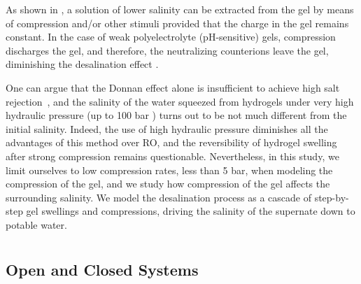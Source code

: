 \documentclass[gels,article,accept,pdftex,moreauthors]{Definitions/mdpi}
\providecommand{\DIFadd}[1]{{\protect\color{blue}\uwave{#1}}} %
\providecommand{\DIFaddbegin}{} %
\providecommand{\DIFaddend}{} %
\providecommand{\DIFdelbegin}{} %
\providecommand{\DIFdelend}{} %
\begin{document}
As shown in \cite{Li2011, Ali2015, Arens_2017, Fengler_2020}, a solution of lower salinity can be extracted from the gel by means of compression and/or other stimuli provided that the charge in the gel remains constant.
In the case of weak polyelectrolyte (pH-sensitive) gels, compression discharges the gel, and therefore, the neutralizing counterions leave the gel, diminishing the desalination effect \cite{Rud2018}.

One can argue that the Donnan effect alone is insufficient to achieve high salt rejection~\cite{Cai2016}, and the salinity of the water squeezed from hydrogels under very high hydraulic pressure (up to 100 bar \cite{Fengler_2020}) turns out to be not much different from the initial salinity.
Indeed, the use of high hydraulic pressure diminishes all the advantages of this method over RO, and the reversibility of hydrogel swelling after strong compression remains questionable.
Nevertheless, in this study, we limit ourselves to low compression rates, less than 5 bar, when modeling the compression of the gel, and we study how compression of the gel affects the surrounding salinity.
We model the desalination process as a cascade of step-by-step gel swellings and compressions, driving the salinity of the supernate down to potable water.

\section{\DIFdelbegin %
\DIFdelend \DIFaddbegin \DIFadd{Results and Discussion}\label{sec: RD}\DIFaddend }
\DIFdelbegin %

\DIFdelend %


\subsection{Open and Closed Systems}
\end{document}
